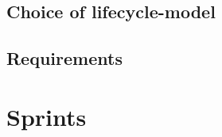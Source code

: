 \documentclass[12pt]{report}
\begin{document}
	


		
		

		

		

		

		

		

		

		

		

		

		

		




		

\chapter{Choice of lifecycle-model}

	

	

\chapter{Requirements}
	
	

\part{Sprints}
\end{document}

